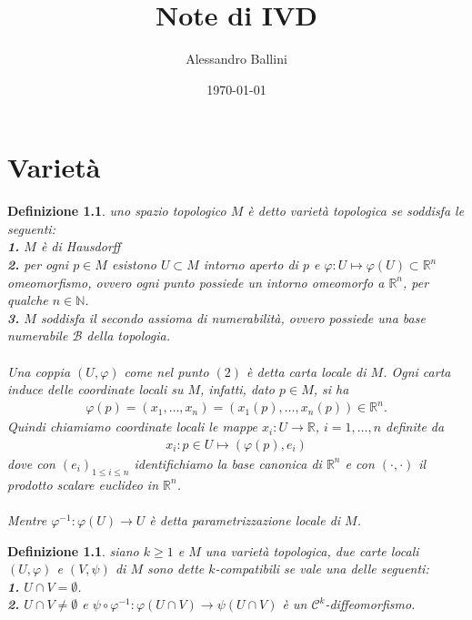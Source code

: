 \documentclass[oneside, 11pt]{amsbook}
\newcommand{\B}{\mathcal{B}}
\newcommand{\C}{\mathcal{C}}
\newcommand{\R}{\mathbb{R}}
\newcommand{\vp}{\varphi}
\newcommand{\co}[1]{\textit{#1}}
\newcommand{\gr}[1]{\textbf{#1}}
\newcommand{\0}{{(0)}}
\newcommand{\3}{{(3)}}
\theoremstyle{colonplain}
\theoremstyle{colondefinition}
\newtheorem{defn}[thm]{Definizione}
\theoremstyle{colonremark}
\numberwithin{equation}{chapter}
\begin{document}
\date{\today}
\author{Alessandro Ballini}


\title{Note di IVD}

\maketitle
\tableofcontents

\chapter{Varietà}
\begin{defn}
    uno spazio topologico $M$ è detto \co{varietà topologica} se soddisfa le seguenti: \\
    \gr{1.} $M$ è di Hausdorff \\
    \gr{2.} per ogni $p \in M$ esistono $U \subset M$ intorno aperto di $p$ e $\vp : U \mapsto \vp(U) \subset \R^n$ omeomorfismo, ovvero ogni punto possiede un intorno omeomorfo a $\R^n$, per qualche $n \in \mathbb{N}$. \\
    \gr{3.} $M$ soddisfa il secondo assioma di numerabilità, ovvero possiede una base numerabile $\B$ della topologia. \\ \\
    Una coppia $(U, \vp)$ come nel punto $(2)$ è detta \co{carta locale} di $M$. Ogni carta induce delle \co{coordinate locali} su $M$, infatti, dato $p \in M$, si ha
    \begin{align}
        \vp(p) = (x_1, \dots, x_n) = (x_1(p), \dots, x_n(p)) \in \R^n.
    \end{align}
    Quindi chiamiamo coordinate locali le mappe $x_i : U \longrightarrow \R$, $i = 1, \dots, n$ definite da
    \begin{align}
        x_i : p \in U \mapsto (\vp(p), e_i)
    \end{align}
    dove con $(e_i)_{1 \leq i \leq n}$ identifichiamo la base canonica di $\R^n$ e con $(\cdot, \cdot)$ il prodotto scalare euclideo in $\R^n$. \\ \\
    Mentre $\vp^{-1} : \vp(U) \longrightarrow U$ è detta \co{parametrizzazione locale} di $M$.
\end{defn}
\begin{defn}
    siano $k \geq 1$ e $M$ una varietà topologica, due carte locali $(U, \vp)$ e $(V, \psi)$ di $M$ sono dette $k$-\co{compatibili} se vale una delle seguenti: \\
    \gr{1.} $U \cap V = \emptyset$. \\
    \gr{2.} $U \cap V \neq \emptyset$ e $\psi \circ \vp^{-1} : \vp(U \cap V) \longrightarrow \psi(U \cap V)$ è un $\C^k$-diffeomorfismo.
\end{defn}
\end{document}
